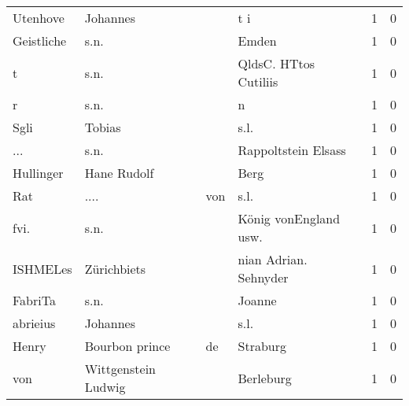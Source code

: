 \begin{tabular}{llllrr}
                 Utenhove &                           Johannes &             &                                         t i &          1 &         0 \\
               Geistliche &                               s.n. &             &                                       Emden &          1 &         0 \\
                        t &                               s.n. &             &                       QldsC. HTtos Cutiliis &          1 &         0 \\
                        r &                               s.n. &             &                                           n &          1 &         0 \\
                     Sgli &                             Tobias &             &                                        s.l. &          1 &         0 \\
                      ... &                               s.n. &             &                         Rappoltstein Elsass &          1 &         0 \\
                Hullinger &                        Hane Rudolf &             &                                        Berg &          1 &         0 \\
                      Rat &                               .... &         von &                                        s.l. &          1 &         0 \\
                     fvi. &                               s.n. &             &                      König vonEngland usw.  &          1 &         0 \\
                 ISHMELes &                        Zürichbiets &             &                       nian Adrian. Sehnyder &          1 &         0 \\
                  FabriTa &                               s.n. &             &                                      Joanne &          1 &         0 \\
                 abrieius &                           Johannes &             &                                        s.l. &          1 &         0 \\
                    Henry &                     Bourbon prince &          de &                                    Straburg &          1 &         0 \\
                      von &                Wittgenstein Ludwig &             &                                   Berleburg &          1 &         0 \\

\end{tabular}
